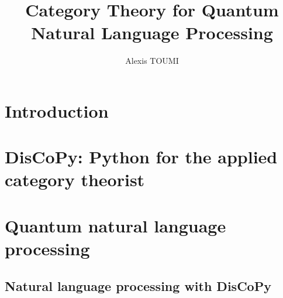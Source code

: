 

\title{Category Theory for Quantum\\
Natural Language Processing}
\author{Alexis TOUMI}

\degreedate{\today}




\begin{romanpages}
\maketitle



\tableofcontents

\end{romanpages}

\chapter*{Introduction}






\chapter{DisCoPy: Python for the applied category theorist}














\chapter{Quantum natural language processing} \label{chapter-2:qnlp}

\section{Natural language processing with DisCoPy}\label{section:NLP}
